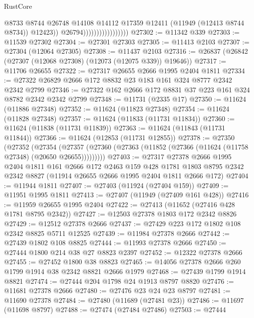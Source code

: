 \begin{lexlean}{RustCore}
\begin{coremodule}
                                          @8733
                                          @8744
                                          @26748
                                          @14108
                                          @14112
                                          @17359
                                          @12411
                                          (@11949 (@12413 @8744 @8734))
                                          @12423))
                                      @26794)))))))))))))))))
@27302 := @11342 @339
@27303 := @11539 @27302
@27304 := @27301 @27303
@27305 := @11413 @2103
@27307 := @27304 (@12064 @27305)
@27308 := @11437 @2103
@27316 := @26837 (@26842 (@27307 (@12068 @27308) (@12073 (@12075 @339)) @19646))
@27317 := @11706 @26655
@27322 := @27317 @26655 @2666 @1995 @2404 @1811
@27334 := @27322 @26829 @2666 @172 @8832 @23 @183 @161 @324 @8777 @2342 @2342 @2799
@27346 := @27322 @162 @2666 @172 @8831 @37 @223 @161 @324 @8782 @2342 @2342 @2799
@27348 := @11731 (@2335 @17)
@27350 := @11624 (@11886 @27348)
@27352 := @11624 (@11823 @27348)
@27354 := @11624 (@11828 @27348)
@27357 := @11624 (@11833 (@11731 @11834))
@27360 := @11624 (@11838 (@11731 @11839))
@27363 := @11624 (@11843 (@11731 @11844))
@27366 := @11624 (@12853 (@11731 @12855))
@27378 := @27350
    (@27352
      (@27354
        (@27357 (@27360 (@27363 (@11852 (@27366 (@11624 (@11758 @27348) (@20650 @26655)))))))))
@27403 := @27317
    @27378
    @2666
    @1995
    @2404
    @1811
    @161
    @2666
    @172
    @2463
    @159
    @428
    @1781
    @1803
    @8795
    @2342
    @2342
    @8827
    (@11914 @26655 @2666 @1995 @2404 @1811 @2666 @172)
@27404 := @11944 @1811
@27407 := @27403 (@11924 (@27404 @159))
@27409 := @11951 @1995 @1811
@27413 := @27407 (@11949 (@27409 @161 @428))
@27416 := @11959 @26655 @1995 @2404
@27422 := @27413 (@11652 (@27416 @428 @1781 @8795 @2342))
@27427 := @12503 @27378 @1803 @172 @2342 @8826
@27429 := @12512 @27378 @2666
@27437 := @27429 @223 @172 @1802 @108 @2342 @8825 @5711 @12525
@27439 := @11984 @27378 @2666
@27442 := @27439 @1802 @108 @8825
@27444 := @11993 @27378 @2666
@27450 := @27444 @1800 @214 @38 @27 @8823 @2397
@27452 := @12322 @27378 @2666
@27455 := @27452 @1800 @38 @8823
@27465 := @14056 @27378 @2666 @260 @1799 @1914 @38 @2342 @8821 @2666 @1979
@27468 := @27439 @1799 @1914 @8821
@27474 := @27444 @204 @1798 @24 @1913 @8797 @8820
@27476 := @11681 @27378 @2666
@27480 := @27476 @23 @24 @23 @8797
@27481 := @11690 @27378
@27484 := @27480 (@11689 (@27481 @23))
@27486 := @11697 (@11698 @8797)
@27488 := @27474 (@27484 @27486)
@27503 := @27444

\end{coremodule}
\end{lexlean}
